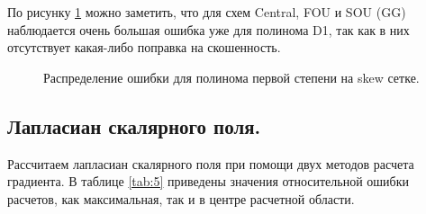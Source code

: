 По рисунку \ref{fig:22} можно заметить, что для схем Central, FOU и SOU (GG)
наблюдается очень большая ошибка уже для полинома D1, так как в них
отсутствует какая-либо поправка на скошенность.


\begin{figure}[H]
    \centering
    \caption{Распределение ошибки для полинома первой степени на skew сетке.}
    \label{fig:22}
\end{figure}

\subsection{Лапласиан скалярного поля.}

Рассчитаем лапласиан скалярного поля при помощи двух методов расчета градиента. В таблице \ref{tab:5} приведены значения относительной ошибки расчетов, как максимальная, так и в центре расчетной области.

